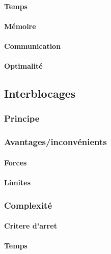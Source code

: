 \documentclass[a4paper, 10pt]{article}
\begin{document}
\paragraph{Temps}

\paragraph{Mémoire}

\paragraph{Communication}

\paragraph{Optimalité}

\subsection{Interblocages}

\subsubsection{Principe}

\subsubsection{Avantages/inconvénients}

\paragraph{Forces}

\paragraph{Limites}

\subsubsection{Complexité}

\paragraph{Critere d'arret}

\paragraph{Temps}
\end{document}
